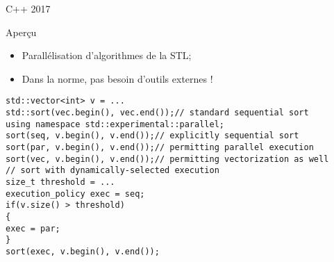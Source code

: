 \documentclass[handout,francais]{beamer}
\begin{document}
\begin{frame}[fragile]{C++ 2017}
 \begin{block}{Aperçu}
  \begin{itemize}
   \item Parallélisation d'algorithmes de la STL;
   \item Dans la norme, pas besoin d'outils externes !
  \end{itemize}

 \end{block}

\begin{lstlisting}
std::vector<int> v = ...
std::sort(vec.begin(), vec.end());// standard sequential sort
using namespace std::experimental::parallel;
sort(seq, v.begin(), v.end());// explicitly sequential sort
sort(par, v.begin(), v.end());// permitting parallel execution
sort(vec, v.begin(), v.end());// permitting vectorization as well
// sort with dynamically-selected execution
size_t threshold = ...
execution_policy exec = seq;
if(v.size() > threshold)
{
exec = par;
}
sort(exec, v.begin(), v.end());
\end{lstlisting}
\end{frame}
\end{document}
